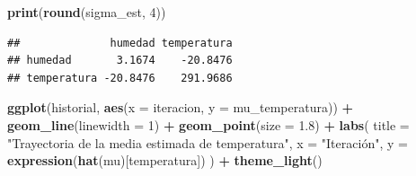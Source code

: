 \documentclass[
]{article}
\newenvironment{Shaded}{\begin{snugshade}}{\end{snugshade}}
\newcommand{\AttributeTok}[1]{\textcolor[rgb]{0.13,0.29,0.53}{#1}}
\newcommand{\CommentTok}[1]{\textcolor[rgb]{0.56,0.35,0.01}{\textit{#1}}}
\newcommand{\DecValTok}[1]{\textcolor[rgb]{0.00,0.00,0.81}{#1}}
\newcommand{\FloatTok}[1]{\textcolor[rgb]{0.00,0.00,0.81}{#1}}
\newcommand{\FunctionTok}[1]{\textcolor[rgb]{0.13,0.29,0.53}{\textbf{#1}}}
\newcommand{\NormalTok}[1]{#1}
\newcommand{\OtherTok}[1]{\textcolor[rgb]{0.56,0.35,0.01}{#1}}
\newcommand{\SpecialCharTok}[1]{\textcolor[rgb]{0.81,0.36,0.00}{\textbf{#1}}}
\newcommand{\StringTok}[1]{\textcolor[rgb]{0.31,0.60,0.02}{#1}}
\begin{document}
\begin{Shaded}
\begin{Highlighting}[]
\FunctionTok{print}\NormalTok{(}\FunctionTok{round}\NormalTok{(sigma\_est, }\DecValTok{4}\NormalTok{))}
\end{Highlighting}
\end{Shaded}

\begin{verbatim}
##              humedad temperatura
## humedad       3.1674    -20.8476
## temperatura -20.8476    291.9686
\end{verbatim}

\begin{Shaded}
\end{Shaded}

\begin{Shaded}
\begin{Highlighting}[]
\FunctionTok{ggplot}\NormalTok{(historial, }\FunctionTok{aes}\NormalTok{(}\AttributeTok{x =}\NormalTok{ iteracion, }\AttributeTok{y =}\NormalTok{ mu\_temperatura)) }\SpecialCharTok{+}
  \FunctionTok{geom\_line}\NormalTok{(}\AttributeTok{linewidth =} \DecValTok{1}\NormalTok{) }\SpecialCharTok{+}
  \FunctionTok{geom\_point}\NormalTok{(}\AttributeTok{size =} \FloatTok{1.8}\NormalTok{) }\SpecialCharTok{+}
  \FunctionTok{labs}\NormalTok{(}
    \AttributeTok{title =} \StringTok{"Trayectoria de la media estimada de temperatura"}\NormalTok{,}
    \AttributeTok{x =} \StringTok{"Iteración"}\NormalTok{,}
    \AttributeTok{y =} \FunctionTok{expression}\NormalTok{(}\FunctionTok{hat}\NormalTok{(mu)[temperatura])}
\NormalTok{  ) }\SpecialCharTok{+}
  \FunctionTok{theme\_light}\NormalTok{()}
\end{Highlighting}
\end{Shaded}
\end{document}
